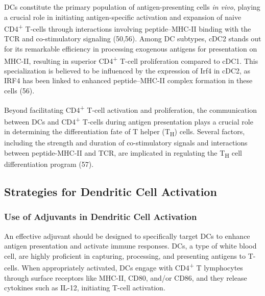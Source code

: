 \documentclass[
]{article}
\begin{document}
DCs constitute the primary population of antigen-presenting cells
\emph{in vivo}, playing a crucial role in initiating antigen-specific
activation and expansion of naive CD4\textsuperscript{+} T-cells through
interactions involving peptide--MHC-II binding with the TCR and
co-stimulatory signaling (50,56). Among DC subtypes, cDC2 stands out for
its remarkable efficiency in processing exogenous antigens for
presentation on MHC-II, resulting in superior CD4\textsuperscript{+}
T-cell proliferation compared to cDC1. This specialization is believed
to be influenced by the expression of Irf4 in cDC2, as IRF4 has been
linked to enhanced peptide--MHC-II complex formation in these cells
(56).

Beyond facilitating CD4\textsuperscript{+} T-cell activation and
proliferation, the communication between DCs and CD4\textsuperscript{+}
T-cells during antigen presentation plays a crucial role in determining
the differentiation fate of T helper (T\textsubscript{H}) cells. Several
factors, including the strength and duration of co-stimulatory signals
and interactions between peptide-MHC-II and TCR, are implicated in
regulating the T\textsubscript{H} cell differentiation program (57).

\subsection{Strategies for Dendritic Cell
Activation}\label{strategies-for-dendritic-cell-activation}

\subsubsection{Use of Adjuvants in Dendritic Cell
Activation}\label{use-of-adjuvants-in-dendritic-cell-activation}

An effective adjuvant should be designed to specifically target DCs to
enhance antigen presentation and activate immune responses. DCs, a type
of white blood cell, are highly proficient in capturing, processing, and
presenting antigens to T-cells. When appropriately activated, DCs engage
with CD4\textsuperscript{+} T lymphocytes through surface receptors like
MHC-II, CD80, and/or CD86, and they release cytokines such as IL-12,
initiating T-cell activation.
\end{document}

